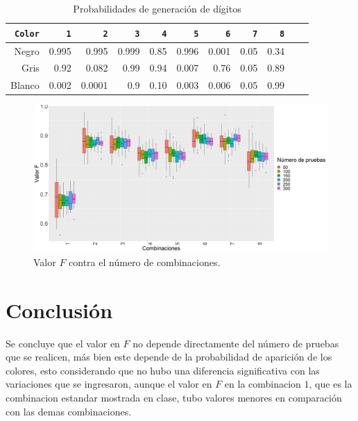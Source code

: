 \documentclass{article}
\begin{document}
\begin{table} 
 \caption{Probabilidades de generaci\'on de d\'igitos}
 \label{t1}
 \begin{center}
 \begin{tabular}{|r|r|r|r|r|r|r|r|r|r|r|}
\hline
\texttt{Color} & \texttt{1} & \texttt{2} &\texttt{3} & \texttt{4}  & \texttt{5} &\texttt{6} & \texttt{7}  & \texttt{8} \\
\hline
Negro& 0.995 & 0.995 & 0.999 & 0.85 & 0.996 & 0.001 & 0.05 & 0.34  \\     
\hline
Gris & 0.92 & 0.082 & 0.99 & 0.94 & 0.007 & 0.76 & 0.05 & 0.89 \\ 
\hline
Blanco  & 0.002 & 0.0001 & 0.9 & 0.10 & 0.003 & 0.006 & 0.05 & 0.99 \\ 
\hline
\end{tabular}
\end{center}
\end{table}


\begin{figure}[H]
       \centering
           \includegraphics[width=1.3\linewidth]{P12.png}
           \caption{Valor $F$ contra el n\'umero de combinaciones.}
           \label{f1}
\end{figure}

\section{Conclusi\'{o}n}\label{con}

Se concluye que el valor en $F$ no depende directamente del n\'umero de pruebas que se realicen, m\'as bien este depende de la probabilidad de aparici\'on de los colores, esto considerando que no hubo una diferencia significativa con las variaciones que se ingresaron, aunque el valor en $F$ en la combinacion $1$, que es la combinacion estandar mostrada en clase, tubo valores menores en comparaci\'on con las demas combinaciones.



  
  
\end{document}
